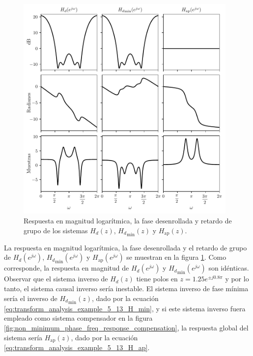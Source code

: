 \documentclass[a4paper]{report}
\begin{document}
\begin{figure}[!htb]
 \begin{center}
 \includegraphics[width=0.97\textwidth]{figuras/example_5_13_H_freq_responses.pdf}
 \caption{\label{fig:transform_analysis_example_5_13_H_freq_responses} Respuesta en magnitud logarítmica, la fase desenrollada y retardo de grupo de los sistemas \(H_d(z)\), \({H_d}_\textrm{min}(z)\) y \(H_\textrm{ap}(z)\).}
 \end{center}
\end{figure}
La respuesta en magnitud logarítmica, la fase desenrollada y el retardo de grupo de \(H_d(e^{j\omega})\), \({H_d}_\textrm{min}(e^{j\omega})\) y \(H_\textrm{ap}(e^{j\omega})\) se muestran en la figura \ref{fig:transform_analysis_example_5_13_H_freq_responses}. Como corresponde, la respuesta en magnitud de \(H_d(e^{j\omega})\) y \({H_d}_\textrm{min}(e^{j\omega})\) son idénticas.
Observar que el sistema inverso de \(H_d(z)\) tiene polos en \(z=1.25e^{\pm j0.8\pi}\) y por lo tanto, el sistema causal inverso sería inestable. El sistema inverso de fase mínima sería el inverso de \({H_d}_\textrm{min}(z)\), dado por la ecuación \ref{eq:transform_analysis_example_5_13_H_min}, y si este sistema inverso fuera empleado como sistema compensador en la figura \ref{fig:non_minimum_phase_freq_response_compensation}, la respuesta global del sistema sería \(H_\textrm{ap}(z)\), dado por la ecuación \ref{eq:transform_analysis_example_5_13_H_ap}.
\end{document}
